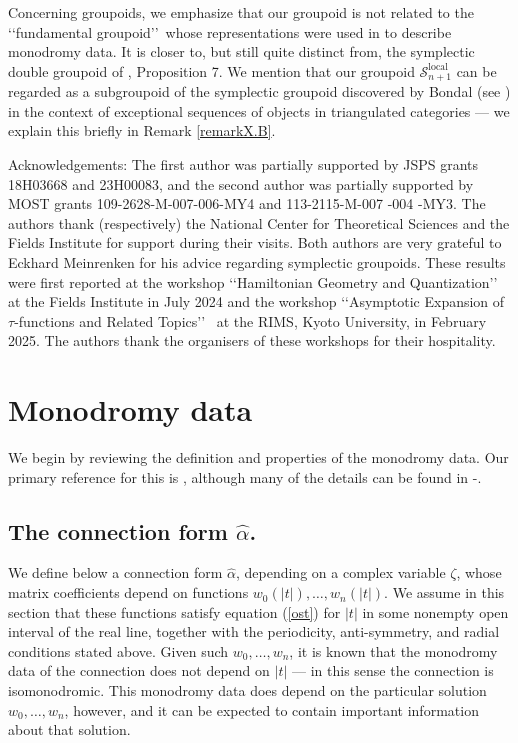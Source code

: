 \documentclass[a4paper,12pt,leqno]{amsart}
\numberwithin{equation}{section}
\theoremstyle{plain}
\theoremstyle{definition}
\newcommand{\al}{\alpha}
\newcommand{\ze}{\zeta}
\newcommand{\cS}{\mathcal{S}}
\renewcommand{\ll}{\lq\lq}
\newcommand{\rr}{\rq\rq\ }
\begin{document}
Concerning groupoids, we emphasize that our groupoid is not related to the \ll fundamental groupoid\rr whose representations were used in \cite{Bo01} to describe monodromy data.  It is closer to, but still quite distinct from, the symplectic double groupoid of \cite{Bo07}, Proposition 7.
We mention that our groupoid $\cS_{n+1}^{\text{local}}$ can be regarded as a subgroupoid of the symplectic groupoid discovered by Bondal (see \cite{Bo04}) in the context of
exceptional sequences of objects in triangulated categories
--- we explain this briefly in Remark \ref{remarkX.B}.

Acknowledgements:
The first author was partially supported by JSPS grants 18H03668 and 23H00083, and the second author was partially supported by MOST grants 109-2628-M-007-006-MY4 and 113-2115-M-007 -004 -MY3.
The authors thank (respectively) the
National Center for Theoretical Sciences and the Fields Institute
for support during their visits.
Both authors are very grateful to Eckhard Meinrenken for his advice regarding symplectic groupoids.
These results were first reported at
the workshop
\ll Hamiltonian Geometry and Quantization\rr
at the Fields Institute in July 2024
and the workshop
\ll Asymptotic Expansion of $\tau$-functions and Related Topics\rr
at the RIMS, Kyoto University, in February 2025.
The authors thank the organisers of these workshops for their hospitality.


\section{Monodromy data}\label{mon}

We begin by reviewing the definition and properties of the monodromy data.
Our primary reference for this is \cite{GH1}, although many of
the details can be found in \cite{GIL1}-\cite{GuLi14}.

\subsection{The connection form $\hat\al$.}\label{hatal}

We define below a connection form $\hat\al$, depending on a complex variable $\ze$,
whose matrix coefficients depend on functions
$w_0(\vert t\vert),\dots,w_n(\vert t\vert)$. We assume in this section that these functions satisfy equation (\ref{ost}) for
$\vert t\vert$ in
some nonempty open interval of the real line,
together with the periodicity, anti-symmetry, and radial conditions stated above.
Given such $w_0,\dots,w_n$, it is known that the monodromy data of the connection
does not depend on $\vert t\vert$ --- in this sense the
connection is isomonodromic.  This  monodromy data does depend on the particular solution $w_0,\dots,w_n$,
however, and it can be expected to contain important information about that solution.
\end{document}
